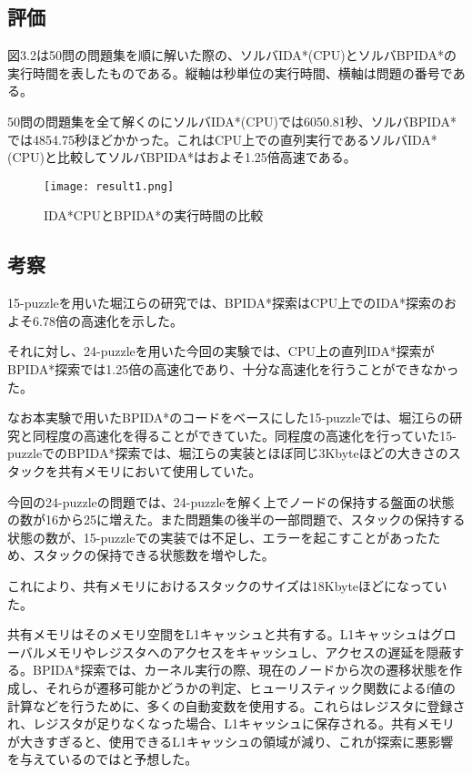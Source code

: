 \documentclass[a4paper,11pt,oneside,openany]{jsbook}
\begin{document}
\subsection{評価}
図3.2は50問の問題集を順に解いた際の、ソルバIDA*(CPU)とソルバBPIDA*の実行時間を表したものである。縦軸は秒単位の実行時間、横軸は問題の番号である。

50問の問題集を全て解くのにソルバIDA*(CPU)では6050.81秒、ソルバBPIDA*では4854.75秒ほどかかった。これはCPU上での直列実行であるソルバIDA*(CPU)と比較してソルバBPIDA*はおよそ1.25倍高速である。


\begin{figure}[hbtp]
\begin{center}
\texttt{[image: result1.png]}
\caption{IDA*CPUとBPIDA*の実行時間の比較}
\end{center}
\end{figure}


\subsection{考察}
15-puzzleを用いた堀江らの研究では、BPIDA*探索はCPU上でのIDA*探索のおよそ6.78倍の高速化を示した。

それに対し、24-puzzleを用いた今回の実験では、CPU上の直列IDA*探索がBPIDA*探索では1.25倍の高速化であり、十分な高速化を行うことができなかった。

なお本実験で用いたBPIDA*のコードをベースにした15-puzzleでは、堀江らの研究と同程度の高速化を得ることができていた。同程度の高速化を行っていた15-puzzleでのBPIDA*探索では、堀江らの実装とほぼ同じ3Kbyteほどの大きさのスタックを共有メモリにおいて使用していた。

今回の24-puzzleの問題では、24-puzzleを解く上でノードの保持する盤面の状態の数が16から25に増えた。また問題集の後半の一部問題で、スタックの保持する状態の数が、15-puzzleでの実装では不足し、エラーを起こすことがあったため、スタックの保持できる状態数を増やした。

これにより、共有メモリにおけるスタックのサイズは18Kbyteほどになっていた。

共有メモリはそのメモリ空間をL1キャッシュと共有する。L1キャッシュはグローバルメモリやレジスタへのアクセスをキャッシュし、アクセスの遅延を隠蔽する。BPIDA*探索では、カーネル実行の際、現在のノードから次の遷移状態を作成し、それらが遷移可能かどうかの判定、ヒューリスティック関数によるf値の計算などを行うために、多くの自動変数を使用する。これらはレジスタに登録され、レジスタが足りなくなった場合、L1キャッシュに保存される。共有メモリが大きすぎると、使用できるL1キャッシュの領域が減り、これが探索に悪影響を与えているのではと予想した。
\end{document}
